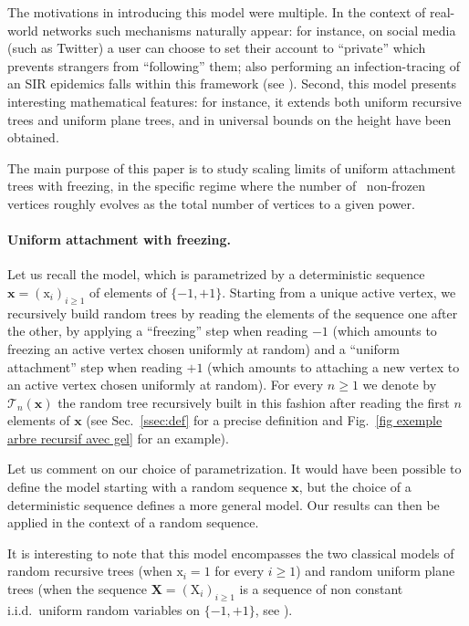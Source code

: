 \documentclass[11pt]{article}
\theoremstyle{plain}
\theoremstyle{definition}
\theoremstyle{remark}
\newcommand{\1}{\mathbbm{1}} %
\newcommand{\T}{\mathcal{T}} %
\newcommand{\Xb}{\mathrm{\mathbf{x}}} %
\newcommand{\X}{\mathrm x} %
\newcommand{\XXb}{\mathrm{\mathbf{X}}} %
\newcommand{\XX}{\mathrm X} %
\begin{document}
The motivations in introducing this model were multiple. In the context of real-world networks such mechanisms naturally appear: for instance, on social media (such as Twitter) a user can choose to set their account to ``private'' which prevents strangers from ``following'' them; also performing an infection-tracing of an SIR epidemics falls within this framework (see \cite{BBKK23+}). Second, this model presents interesting mathematical features: for instance, it extends both uniform recursive trees and uniform plane trees, and in \cite{BBKK23+} universal bounds on the height have been obtained.

The main purpose of this paper is to study scaling limits of uniform attachment trees with freezing, in the specific regime where the number of ~non-frozen vertices roughly evolves  as the total number of vertices to a given power. 



\paragraph{Uniform attachment with freezing.} Let us recall the model, which is parametrized by  a deterministic sequence $\Xb=(\X_i)_{i \geq 1}$  of elements of $\{-1,+1\}$. Starting from a unique active vertex, we recursively build random trees by reading the elements of the sequence one after the other, by applying a ``freezing'' step when reading $-1$ (which amounts to freezing an active vertex chosen uniformly at random) and a ``uniform attachment'' step when reading $+1$ (which amounts to attaching a new vertex to an active vertex chosen uniformly at random).  For every $n \geq 1$ we denote by $\T_n(\Xb)$ the random tree recursively built in this fashion after reading the first $n$ elements of $\Xb$ (see Sec.~\ref{ssec:def} for a precise definition and Fig.~\ref{fig exemple arbre recursif avec gel} for an example).

Let us comment on our choice of parametrization. It would have been possible to define the model starting with a random sequence $\Xb$, but the choice of a deterministic sequence defines a more general model.  {Our results can then be applied in the context of a random sequence.}




It is interesting to note that this model encompasses the two classical models of random recursive trees (when $\X_{i}=1$ for every $i \geq 1$) and random uniform plane trees (when the sequence $\XXb =(\XX_{i})_{i \geq 1}$ is a sequence of {non constant} i.i.d.~uniform random variables on $ \{-1,+1\}$, see \cite[{Theorem 2}]{BBKK23+}).
\end{document}
